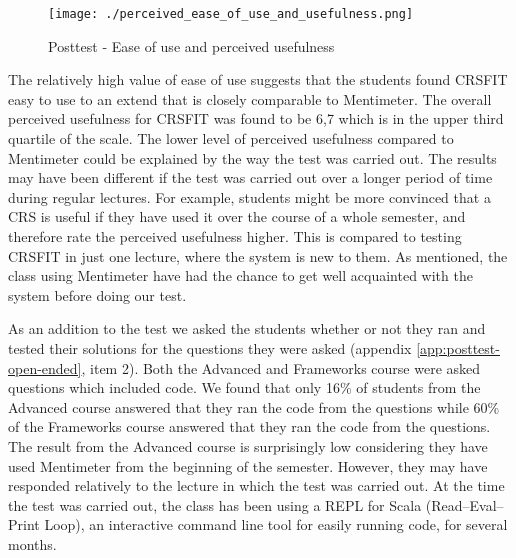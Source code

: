  \begin{figure}[H]
  \centering
     \texttt{[image: ./perceived\_ease\_of\_use\_and\_usefulness.png]}
     \caption{Posttest - Ease of use and perceived usefulness}
     \label{fig:perceived_ease_of_use_and_usefulness}
 \end{figure}
 
The relatively high value of ease of use suggests that the students found CRSFIT easy to use to an extend that is closely comparable to Mentimeter. The overall perceived usefulness for CRSFIT was found to be 6,7 which is in the upper third quartile of the scale. The lower level of perceived usefulness compared to Mentimeter could be explained by the way the test was carried out. The results may have been different if the test was carried out over a longer period of time during regular lectures. For example, students might be more convinced that a CRS is useful if they have used it over the course of a whole semester, and therefore rate the perceived usefulness higher. This is compared to testing CRSFIT in just one lecture, where the system is new to them. As mentioned, the class using Mentimeter have had the chance to get well acquainted with the system before doing our test.

As an addition to the test we asked the students whether or not they ran and tested their solutions for the questions they were asked (appendix \ref{app:posttest-open-ended}, item 2). Both the Advanced and Frameworks course were asked questions which included code. We found that only 16\% of students from the Advanced course answered that they ran the code from the questions while 60\% of the Frameworks course answered that they ran the code from the questions. The result from the Advanced course is surprisingly low considering they have used Mentimeter from the beginning of the semester. However, they may have responded relatively to the lecture in which the test was carried out. At the time the test was carried out, the class has been using a REPL for Scala (Read–Eval–Print Loop), an interactive command line tool for easily running code, for several months.


